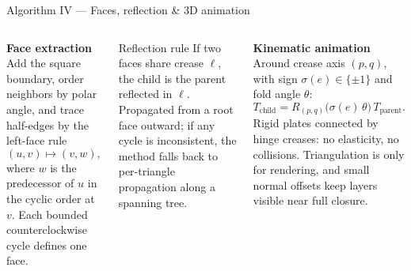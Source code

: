 \documentclass[aspectratio=169,10pt]{beamer}
\begin{document}
\begin{frame}{Algorithm IV — Faces, reflection \& 3D animation}
\begin{columns}[T,onlytextwidth]
\textbf{Face extraction}\\[4pt]
\small Add the square boundary, order neighbors by polar angle, and trace
half-edges by the left-face rule
\[
(u,v)\mapsto(v,w),
\]
where \(w\) is the predecessor of \(u\) in the cyclic order at \(v\). Each
bounded counterclockwise cycle defines one face.

\medskip
\begin{block}{Reflection rule}
\small If two faces share crease \(\ell\), the child is the parent reflected
in \(\ell\). Propagated from a root face outward; if any cycle is inconsistent,
the method falls back to per-triangle propagation along a spanning tree.
\end{block}

\textbf{Kinematic animation \cite{abel_rigid,tachi_simulation}}\\[4pt]
Around crease axis \((p,q)\), with sign \(\sigma(e)\in\{\pm 1\}\) and fold
angle \(\theta\):
\[
T_{\text{child}} = R_{(p,q)}\!\bigl(\sigma(e)\,\theta\bigr)\,T_{\text{parent}}.
\]
\small Rigid plates connected by hinge creases: no elasticity, no collisions.
Triangulation is only for rendering, and small normal offsets keep layers
visible near full closure.
\end{columns}
\end{frame}
\end{document}
